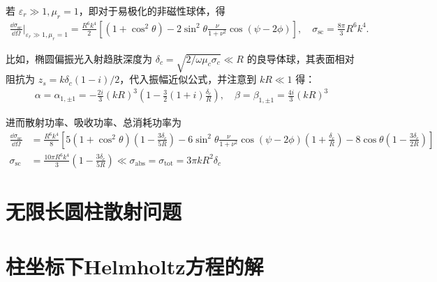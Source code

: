 \begin{exbox}
	若 \(\varepsilon_r\gg1,\mu_r=1\)，即对于易极化的非磁性球体，得
	\begin{align*}
		\frac{\dd \sigma_{\text{sc}}}{\dd \Omega}\bigg|_{\varepsilon_r\gg1,\mu_r=1} = \frac{R^6k^4}{2}\left[(1+\cos^2\theta)-2\sin^2\theta\frac{\nu}{1+\nu^2}\cos(\psi-2\phi)\right],\quad
		\sigma_{\text{sc}} = \frac{8\pi}{3}R^6k^4.
	\end{align*}

	比如，椭圆偏振光入射趋肤深度为 \(\delta_c=\sqrt{2/\omega\mu_c\sigma_c}\ll R\) 的良导体球，其表面相对阻抗为 \(z_s=k\delta_c(1-i)/2\)，代入振幅近似公式，并注意到 \(kR\ll1\) 得：
	\begin{align*}
		\alpha=\alpha_{1,\pm1}=-\frac{2i}{3}(kR)^3\left(1-\frac{3}{2}(1+i)\frac{\delta_c}{R}\right) ,\quad\beta=\beta_{1,\pm1}=\frac{4i}{3}(kR)^3
	\end{align*}

	进而散射功率、吸收功率、总消耗功率为
	\begin{align*}
		\frac{\dd \sigma_{\text{sc}}}{\dd \Omega}&=\frac{R^6k^4}{8}\left[5(1+\cos^2\theta)\left(1-\frac{3\delta_c}{5R}\right)-6\sin^2\theta\frac{\nu}{1+\nu^2}\cos(\psi-2\phi)\left(1+\frac{\delta_c}{R}\right)-8\cos\theta\left(1-\frac{3\delta_c}{2R}\right)\right]\\
		\sigma_{\text{sc}}&=\frac{10\pi R^6k^4}{3}\left(1-\frac{3\delta_c}{5R}\right)\ll\sigma_{\text{abs}}=\sigma_{\text{tot}}=3\pi kR^2\delta_c
	\end{align*}
\end{exbox}

\section{无限长圆柱散射问题}

\section{柱坐标下Helmholtz方程的解}

